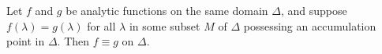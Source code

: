 Let $f$ and $g$ be analytic functions on the same domain $\Delta$, and suppose $f(\lambda) = g(\lambda)$ for all $\lambda$ in some subset $M$ of $\Delta$ possessing an accumulation point in $\Delta$. Then $f \equiv g$ on $\Delta$.
